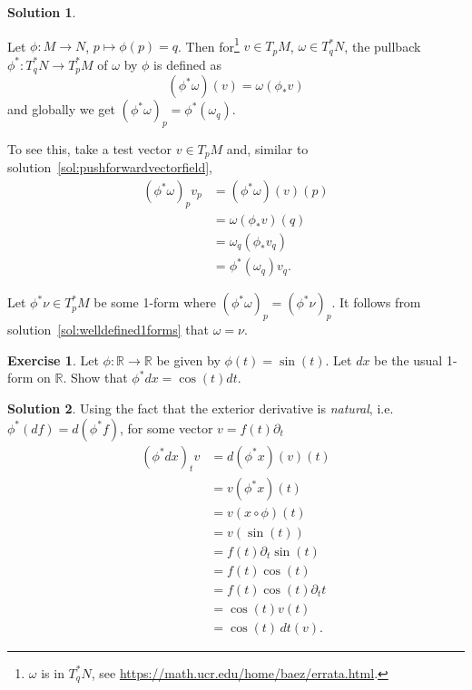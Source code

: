 \documentclass[11pt, a4paper]{article}
\theoremstyle{definition}
\newtheorem{ex}{Exercise}[part]
\newtheorem{sol}{Solution}[part]
\begin{document}
\begin{sol}\label{sol:pullback1form}

Let $\phi: M \to N$, $p \mapsto \phi(p) = q$. Then for\footnote{$\omega$ is in $T_q^* N$, see \url{https://math.ucr.edu/home/baez/errata.html}.} $v \in T_p M$, $\omega \in T_q^* N$, the pullback $\phi^*: T_q^* N \to T_p^* M$ of $\omega$ by $\phi$ is defined as
\[
    (\phi^* \omega)(v) = \omega(\phi_* v) \tag{pullback of a 1-form}\label{eq:pullback1form}
\]
and globally we get ${(\phi^* \omega)}_p = \phi^*(\omega_q)$.

To see this, take a test vector $v \in T_p M$ and, similar to solution~\ref{sol:pushforwardvectorfield},
\begin{align*}
    {(\phi^* \omega)}_p v_p &= (\phi^* \omega) (v) (p) \\
        &= \omega(\phi_* v)(q) \\
        &= \omega_q (\phi_* v_q) \\
        &= \phi^* (\omega_q) v_q.
\end{align*}

Let $\phi^*\nu \in T_p^* M$ be some 1-form where ${(\phi^*\omega)}_p = {(\phi^*\nu)}_p$. It follows from solution~\ref{sol:welldefined1forms} that $\omega = \nu$.

\end{sol}

\begin{ex}

Let $\phi: \mathbb{R} \to \mathbb{R}$ be given by $\phi(t) = \sin(t)$. Let $dx$ be the usual 1-form on $\mathbb{R}$. Show that $\phi^*dx = \cos(t) dt$.

\end{ex}

\begin{sol}

Using the fact that the exterior derivative is \emph{natural}, i.e. $\phi^*(df) = d(\phi^*f)$, for some vector $v = f(t)\partial_t$
\begin{align*}
    {(\phi^* dx)}_t v &= d(\phi^* x) (v)(t) \\
        &= v(\phi^* x) (t) \\
        &= v(x \circ \phi)(t) \\
        &= v(\sin(t)) \\
        &= f(t) \partial_t \sin(t) \\
        &= f(t) \cos(t) \\
        &= f(t) \cos(t) \partial_t t \\
        &= \cos(t) v(t) \\
        &= \cos(t) \, dt(v).
\end{align*}

\end{sol}
\end{document}
